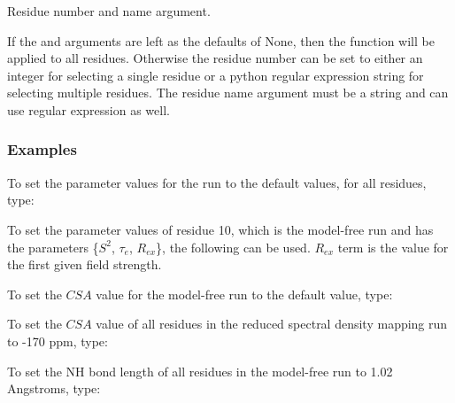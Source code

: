 Residue number and name argument.

If the 
 and 
 arguments are left as the defaults of None, then the
function will be applied to all residues.  Otherwise the residue number can be set to either
an integer for selecting a single residue or a python regular expression string for
selecting multiple residues.  The residue name argument must be a string and can use regular
expression as well.


\subsubsection{Examples}

To set the parameter values for the run 
 to the default values, for all residues,
type:




To set the parameter values of residue 10, which is the model-free run 
 and has the
parameters \{$S^2$, $\tau_e$, $R_{ex}$\}, the following can be used.  $R_{ex}$ term is the value for the first
given field strength.





To set the $CSA$ value for the model-free run 
 to the default value, type:




To set the $CSA$ value of all residues in the reduced spectral density mapping run 
 to
-170 ppm, type:





To set the NH bond length of all residues in the model-free run 
 to 1.02 Angstroms,
type:





